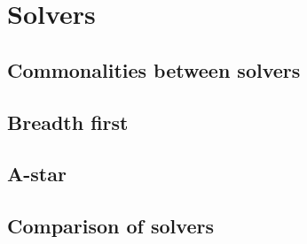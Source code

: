 \documentclass[../../main.tex]{subfiles}
\begin{document}
%

\section{Solvers}
\label{sub:solvers}


\subsection{Commonalities between solvers}%
\label{sub:commonalities}


\subsection{Breadth first}%
\label{sub:breadth_first}




\subsection{A-star}%
\label{sub:a_star}


\subsection{Comparison of solvers}%
\label{sub:comparison_of_solvers}





	
\end{document}
